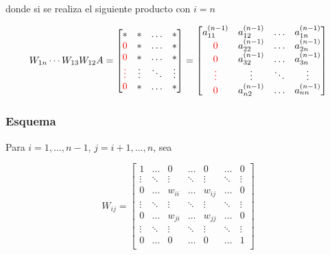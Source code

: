 \

donde si se realiza el siguiente producto con $i = n$

\[
W_{1n}\cdots W_{13}W_{12}A =
\begin{bmatrix}
    * & * & \ldots & * \\
    \textcolor{red}{0} & * & \ldots & * \\
    \textcolor{red}{0} & * & \ldots & * \\
    \textcolor{red}{\vdots} & \vdots & \ddots & \vdots \\
    \textcolor{red}{0} & * & \ldots & * \\
\end{bmatrix}
=
\begin{bmatrix}
    a_{11}^{(n-1)} & a_{12}^{(n-1)} & \ldots & a_{1n}^{(n-1)} \\
    \textcolor{red}{0} & a_{22}^{(n-1)} & \ldots & a_{2n}^{(n-1)} \\
    \textcolor{red}{0} & a_{32}^{(n-1)} & \ldots & a_{3n}^{(n-1)} \\
    \textcolor{red}{\vdots} & \vdots & \ddots & \vdots \\
    \textcolor{red}{0} & a_{n2}^{(n-1)} & \ldots & a_{nn}^{(n-1)} \\
\end{bmatrix}
\]

\subsubsection{Esquema}\label{subsubsec:givens_esquema}

Para $i = 1,\ldots,n-1$, $j = i+1,\ldots,n$, sea

\[
W_{ij} =
\begin{bmatrix}    
    1 & \ldots & 0 & \ldots & 0 & \ldots & 0 \\
    \vdots & \ddots & \vdots & \ddots & \vdots & \ddots & \vdots \\
    0 & \ldots & w_{ii} & \ldots & w_{ij} & \ldots & 0 \\
    \vdots & \ddots & \vdots & \ddots & \vdots & \ddots & \vdots \\
    0 & \ldots & w_{ji} & \ldots & w_{jj} & \ldots & 0 \\
    \vdots & \ddots & \vdots & \ddots & \vdots & \ddots & \vdots \\
    0 & \ldots & 0 & \ldots & 0 & \ldots & 1 \\
\end{bmatrix}
\]

\

